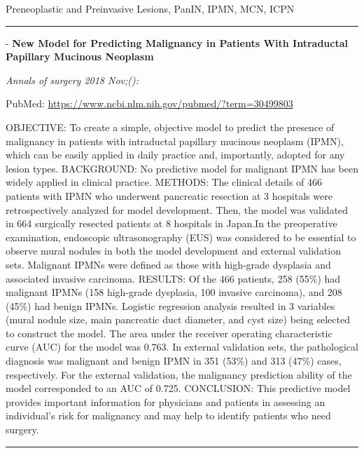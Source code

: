 \documentclass[]{article}
\begin{document}
Preneoplastic and Preinvasive Lesions, PanIN, IPMN, MCN, ICPN

\begin{center}\rule{0.5\linewidth}{\linethickness}\end{center}

 - \textbf{New Model for Predicting Malignancy in Patients With
Intraductal Papillary Mucinous Neoplasm}

\emph{Annals of surgery 2018 Nov;():}

PubMed: \url{https://www.ncbi.nlm.nih.gov/pubmed/?term=30499803}

OBJECTIVE: To create a simple, objective model to predict the presence
of malignancy in patients with intraductal papillary mucinous neoplasm
(IPMN), which can be easily applied in daily practice and, importantly,
adopted for any lesion types. BACKGROUND: No predictive model for
malignant IPMN has been widely applied in clinical practice. METHODS:
The clinical details of 466 patients with IPMN who underwent pancreatic
resection at 3 hospitals were retrospectively analyzed for model
development. Then, the model was validated in 664 surgically resected
patients at 8 hospitals in Japan.In the preoperative examination,
endoscopic ultrasonography (EUS) was considered to be essential to
observe mural nodules in both the model development and external
validation sets. Malignant IPMNs were defined as those with high-grade
dysplasia and associated invasive carcinoma. RESULTS: Of the 466
patients, 258 (55\%) had malignant IPMNs (158 high-grade dysplasia, 100
invasive carcinoma), and 208 (45\%) had benign IPMNs. Logistic
regression analysis resulted in 3 variables (mural nodule size, main
pancreatic duct diameter, and cyst size) being selected to construct the
model. The area under the receiver operating characteristic curve (AUC)
for the model was 0.763. In external validation sets, the pathological
diagnosis was malignant and benign IPMN in 351 (53\%) and 313 (47\%)
cases, respectively. For the external validation, the malignancy
prediction ability of the model corresponded to an AUC of 0.725.
CONCLUSION: This predictive model provides important information for
physicians and patients in assessing an individual's risk for malignancy
and may help to identify patients who need surgery.

{}

{}

\begin{center}\rule{0.5\linewidth}{\linethickness}\end{center}
\end{document}
